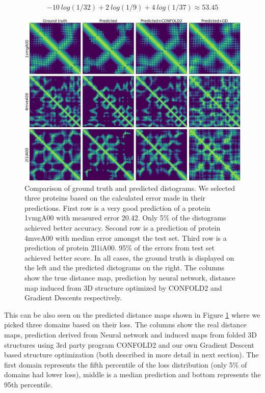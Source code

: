$$- 10~log(1/32) + 2~log(1/9) + 4~log(1 / 37) \approx 53.45$$

\begin{figure}
    \centering
    \includegraphics[width=\linewidth]{imgs_andy/distograms/distance_maps_test_structures.png}
    \caption{Comparison of ground truth and predicted distograms. We selected three proteins based on the calculated error made in their predictions. First row is a very good prediction of a protein 1vmgA00 with measured error 20.42. Only 5\% of the distograms achieved better accuracy. Second row is a prediction of protein 4mveA00 with median error amongst the test set. Third row is a prediction of protein 2l1iA00. 95\% of the errors from test set achieved better score. In all cases, the ground truth is displayed on the left and the predicted distograms on the right. The columns show the true distance map, prediction by neural network, distance map induced from 3D structure optimized by CONFOLD2 and Gradient Descents respectively.}
    \label{fig:distograms}
\end{figure}

This can be also seen on the predicted distance maps shown in Figure \ref{fig:distograms} where we picked three domains based on their loss. The columns show the real distance maps, prediction derived from Neural network and induced maps from folded 3D structures using 3rd party program CONFOLD2 and our own Gradient Descent based structure optimization (both described in more detail in next section). The first domain represents the fifth percentile of the loss distribution (only 5\% of domains had lower loss), middle is a median prediction and bottom represents the 95th percentile.

